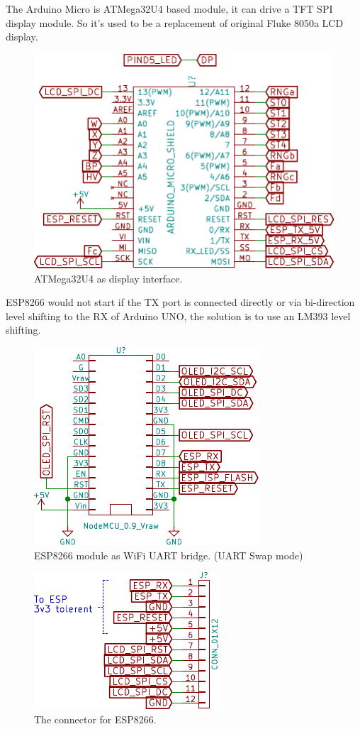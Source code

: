 \documentclass[a4paper,10pt]{article}
\begin{document}
The Arduino Micro is ATMega32U4 based module, it can drive a TFT SPI display module.
So it's used to be a replacement of original Fluke 8050a LCD display.

\begin{figure}[h!t] \centering
    \includegraphics{figures/sch-smartshow-atmega32u4.pdf}
    \caption{ATMega32U4 as display interface.} \label{fig:smartshow-atmega32u4}
\end{figure}

ESP8266 would not start if the TX port is connected directly or via bi-direction level shifting to the RX of Arduino UNO, the solution is to use an LM393 level shifting.

\begin{figure}[h!t] \centering
    \includegraphics{figures/sch-smartshow-esp8266.pdf}
    \caption{ESP8266 module as WiFi UART bridge. (UART Swap mode)} \label{fig:smartshow-esp8266}
\end{figure}


\begin{figure}[h!t] \centering
    \includegraphics{figures/sch-smartshow-port.pdf}
    \caption{The connector for ESP8266.} \label{fig:smartshow-port}
\end{figure}
\end{document}
